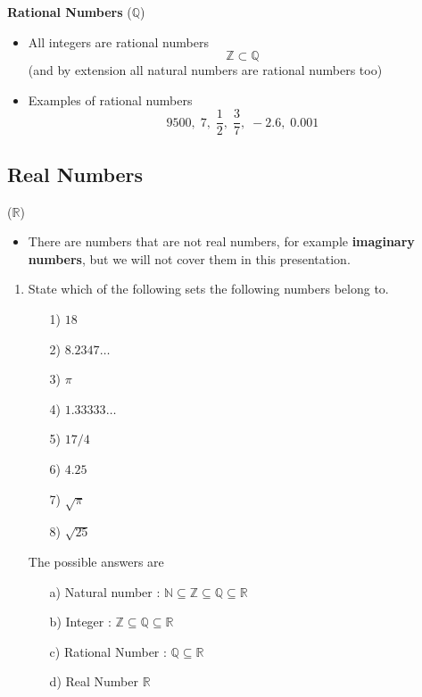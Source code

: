 \documentclass[11pt,a4paper,titlepage,oneside,openany]{article}
\numberwithin{equation}{section}
\numberwithin{algorithm}{section}
\numberwithin{figure}{section}
\numberwithin{table}{section}
\begin{document}
{%


\textbf{Rational Numbers} ($\mathbb{Q}$)
\begin{itemize}
\item All integers are rational numbers 
\[ \mathbb{Z}  \subset \mathbb{Q}\]
(and by extension all natural numbers are rational numbers too)
\item Examples of rational numbers
\[ 9500,\;7,\; \frac{1}{2} ,\; \frac{3}{7},\; -2.6 ,\; 0.001\] 
\end{itemize}




\subsection{Real Numbers} ($\mathbb{R}$)
\begin{itemize}
\item There are numbers that are not real numbers, for example \textbf{imaginary numbers}, but we will not cover them in this presentation.
\end{itemize}




\begin{enumerate}
\item State which of the following sets the following numbers belong to. 
  \begin{multicols}{4}
    \begin{itemize}
    \item[1)] $18$
    \item[2)] $8.2347\ldots$
    \item[3)] $\pi$
    \item[4)] $1.33333\ldots$
    \item[5)] $17/4$
    \item[6)] $4.25$
    \item[7)] $\sqrt{\pi}$
    \item[8)] $\sqrt{25}$
    \end{itemize}
  \end{multicols}The possible answers are
  \begin{multicols}{2}
    \begin{itemize}
    \item[a)] Natural number : $\mathbb{N} \subseteq \mathbb{Z } \subseteq \mathbb{Q} \subseteq \mathbb{R}$
    \item[b)] Integer : $ \mathbb{Z } \subseteq \mathbb{Q} \subseteq \mathbb{R}$
    \item[c)] Rational Number : $ \mathbb{Q} \subseteq \mathbb{R}$
    \item[d)] Real Number $\mathbb{R}$


\end{itemize}
\end{multicols}
\end{enumerate}}
\end{document}
